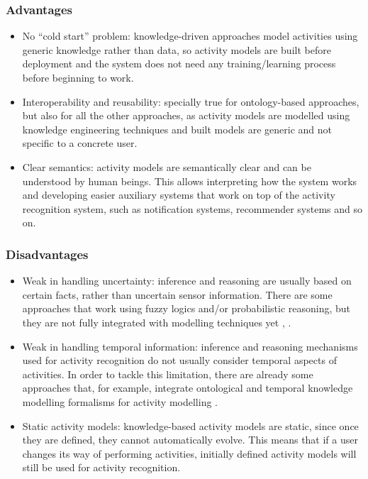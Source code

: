 \subsubsection*{Advantages}
\begin{itemize}
 \item No ``cold start'' problem: knowledge-driven approaches model activities using generic knowledge rather than data, so activity models are built before deployment and the system does not need any training/learning process before beginning to work.
 \item Interoperability and reusability: specially true for ontology-based approaches, but also for all the other approaches, as activity models are modelled using knowledge engineering techniques and built models are generic and not specific to a concrete user. 
 \item Clear semantics: activity models are semantically clear and can be understood by human beings. This allows interpreting how the system works and developing easier auxiliary systems that work on top of the activity recognition system, such as notification systems, recommender systems and so on. 
\end{itemize}

\subsubsection*{Disadvantages}
\begin{itemize}
 \item Weak in handling uncertainty: inference and reasoning are usually based on certain facts, rather than uncertain sensor information. There are some approaches that work using fuzzy logics and/or probabilistic reasoning, but they are not fully integrated with modelling techniques yet \cite{Helaoui2013}, \cite{Almeida2012}.
 \item Weak in handling temporal information: inference and reasoning mechanisms used for activity recognition do not usually consider temporal aspects of activities. In order to tackle this limitation, there are already some approaches that, for example, integrate ontological and temporal knowledge modelling formalisms for activity modelling \cite{Okeyo2012}. 
 \item Static activity models: knowledge-based activity models are static, since once they are defined, they cannot automatically evolve. This means that if a user changes its way of performing activities, initially defined activity models will still be used for activity recognition.
\end{itemize}


